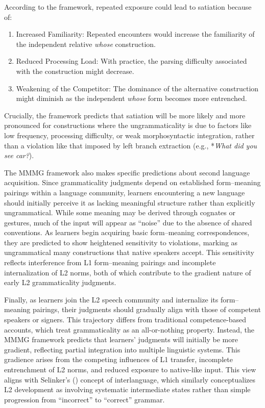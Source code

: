 \documentclass[12pt,letterpaper]{article}
\begin{document}
According to the framework, repeated exposure could lead to satiation because of:

\begin{enumerate}
    \item Increased Familiarity: Repeated encounters would increase the familiarity of the independent relative \textit{whose} construction.
    \item Reduced Processing Load: With practice, the parsing difficulty associated with the construction might decrease.
    \item Weakening of the Competitor: The dominance of the alternative construction might diminish as the independent \textit{whose} form becomes more entrenched.
\end{enumerate}

Crucially, the framework predicts that satiation will be more likely and more pronounced for constructions where the ungrammaticality is due to factors like low frequency, processing difficulty, or weak morphosyntactic integration, rather than a violation like that imposed by left branch extraction (e.g., *\textit{What did you see car?}).

\bigskip
The MMMG framework also makes specific predictions about second language acquisition. Since grammaticality judgments depend on established form--meaning pairings within a language community, learners encountering a new language should initially perceive it as lacking meaningful structure rather than explicitly ungrammatical. While some meaning may be derived through cognates or gestures, much of the input will appear as ``noise'' due to the absence of shared conventions. As learners begin acquiring basic form--meaning correspondences, they are predicted to show heightened sensitivity to violations, marking as ungrammatical many constructions that native speakers accept. This sensitivity reflects interference from L1 form--meaning pairings and incomplete internalization of L2 norms, both of which contribute to the gradient nature of early L2 grammaticality judgments.

Finally, as learners join the L2 speech community and internalize its form--meaning pairings, their judgments should gradually align with those of competent speakers or signers. This trajectory differs from traditional competence-based accounts, which treat grammaticality as an all-or-nothing property. Instead, the MMMG framework predicts that learners’ judgments will initially be more gradient, reflecting partial integration into multiple linguistic systems. This gradience arises from the competing influences of L1 transfer, incomplete entrenchment of L2 norms, and reduced exposure to native-like input. This view aligns with Selinker's (\citeyear{selinker1972}) concept of interlanguage, which similarly conceptualizes L2 development as involving systematic intermediate states rather than simple progression from ``incorrect'' to ``correct'' grammar.
\end{document}
